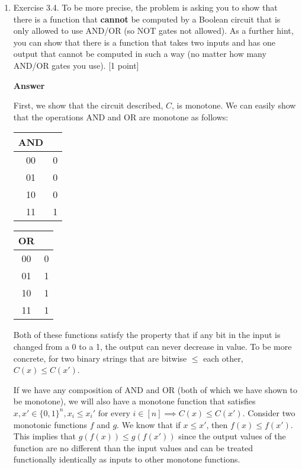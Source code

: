\documentclass[11pt]{article}
\newcommand \kw[1]{\textbf{#1}}
\newenvironment{answer}{
\vspace{.5cm}
\kw{Answer}
}
{

}
\begin{document}
\begin{enumerate}
\begin{answer}
\qed
\end{answer}
\pagebreak

\item Exercise 3.4. To be more precise, the problem is asking you to show that there is a function that {\bf cannot} be computed by a Boolean circuit that is only allowed to use AND/OR (so NOT gates not allowed). As a further hint, you can show that there is a function that takes two inputs and has one output that cannot be computed in such a way (no matter how many AND/OR gates you use). [1 point]

\begin{answer}
    First, we show that the circuit described, $C$, is monotone. We can easily show that the operations AND and OR are monotone as follows:

    \begin{center}
        \begin{tabular}{ |c|c| }
            AND & \\
            \hline
            00 & 0 \\
            01 & 0 \\
            10 & 0 \\
            11 & 1 \\
        \end{tabular} 
        \; \;
        \begin{tabular}{ |c|c| }
            OR & \\
            \hline
            00 & 0 \\
            01 & 1 \\
            10 & 1 \\
            11 & 1 \\
        \end{tabular}
    \end{center}

    Both of these functions satisfy the property that if any bit in the input is changed from a 0 to a 1, the output can never decrease in value. To be more concrete, for two binary strings that are bitwise $\le$ each other, $C(x) \le C(x')$.

    If we have any composition of AND and OR (both of which we have shown to be monotone), we will also have a monotone function that satisfies $x, x' \in \{0,1\}^n, x_i \le x_i' \text{ for every } i \in [n] \implies C(x) \le C(x')$. Consider two monotonic functions $f$ and $g$. We know that if $x \le x'$, then $f(x) \le f(x')$. This implies that $g(f(x)) \le g(f(x'))$ since the output values of the function are no different than the input values and can be treated functionally identically as inputs to other monotone functions.


\end{answer}
\end{enumerate}
\end{document}
